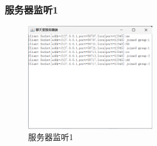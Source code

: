 \documentclass[UTF8,12pt]{article}
\begin{document}
\subsubsection{服务器监听1}
\begin{figure}[htbp]
    \centering
    \includegraphics[width=0.5\textwidth]{img/7.png}
    \caption{服务器监听1}
\end{figure}
\end{document}
